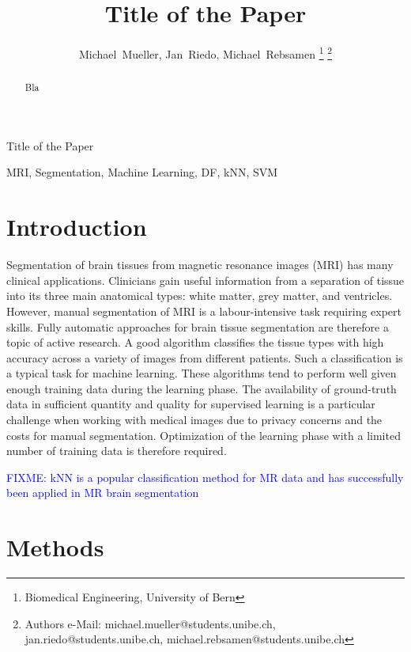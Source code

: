 \documentclass[journal]{IEEEtran}
\newcommand\FIXME[1]{\textcolor{blue}{FIXME: #1}}
\begin{document}
\title{Title of the Paper}


\author{Michael~Mueller,
        Jan~Riedo,
        Michael~Rebsamen%
\thanks{Biomedical Engineering, University of Bern}%
\thanks{Authors e-Mail: michael.mueller@students.unibe.ch, jan.riedo@students.unibe.ch, michael.rebsamen@students.unibe.ch}}%
%
{Title of the Paper}
\maketitle

\begin{abstract}
Bla
\end{abstract}
\begin{IEEEkeywords}
MRI, Segmentation, Machine Learning, DF, kNN, SVM
\end{IEEEkeywords}


\section{Introduction}
Segmentation of brain tissues from magnetic resonance images (MRI) has many clinical applications. Clinicians gain useful information from a separation of tissue into its three main anatomical types: white matter, grey matter, and ventricles. However, manual segmentation of MRI is a labour-intensive task requiring expert skills. Fully automatic approaches for brain tissue segmentation are therefore a topic of active research. A good algorithm classifies the tissue types with high accuracy across a variety of images from different patients. Such a classification is a typical task for machine learning. These algorithms tend to perform well given enough training data during the learning phase. The availability of ground-truth data in sufficient quantity and quality for supervised learning is a particular challenge when working with medical images due to privacy concerns and the costs for manual segmentation. Optimization of the learning phase with a limited number of training data is therefore required.

\FIXME{kNN is a popular classification method for MR data and has successfully been applied in MR brain segmentation\cite{Anbeek2004,Cocosco2003,Warfield2000}}


\section{Methods}
\end{document}
